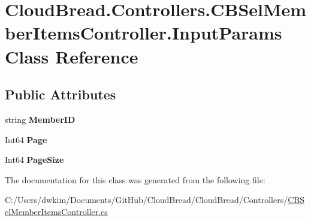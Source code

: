 \hypertarget{class_cloud_bread_1_1_controllers_1_1_c_b_sel_member_items_controller_1_1_input_params}{}\section{Cloud\+Bread.\+Controllers.\+C\+B\+Sel\+Member\+Items\+Controller.\+Input\+Params Class Reference}
\label{class_cloud_bread_1_1_controllers_1_1_c_b_sel_member_items_controller_1_1_input_params}
\subsection*{Public Attributes}
\begin{DoxyCompactItemize}
\item 
string {\bfseries Member\+ID}\hypertarget{class_cloud_bread_1_1_controllers_1_1_c_b_sel_member_items_controller_1_1_input_params_a38b1ef707609faaa2ddc2fcdf3311ef8}{}\label{class_cloud_bread_1_1_controllers_1_1_c_b_sel_member_items_controller_1_1_input_params_a38b1ef707609faaa2ddc2fcdf3311ef8}

\item 
Int64 {\bfseries Page}\hypertarget{class_cloud_bread_1_1_controllers_1_1_c_b_sel_member_items_controller_1_1_input_params_a94ad166a7dc3fdd11ae7272f7536df3b}{}\label{class_cloud_bread_1_1_controllers_1_1_c_b_sel_member_items_controller_1_1_input_params_a94ad166a7dc3fdd11ae7272f7536df3b}

\item 
Int64 {\bfseries Page\+Size}\hypertarget{class_cloud_bread_1_1_controllers_1_1_c_b_sel_member_items_controller_1_1_input_params_a74aa66e4419f55454037db8a5d14b046}{}\label{class_cloud_bread_1_1_controllers_1_1_c_b_sel_member_items_controller_1_1_input_params_a74aa66e4419f55454037db8a5d14b046}

\end{DoxyCompactItemize}


The documentation for this class was generated from the following file\+:\begin{DoxyCompactItemize}
\item 
C\+:/\+Users/dwkim/\+Documents/\+Git\+Hub/\+Cloud\+Bread/\+Cloud\+Bread/\+Controllers/\hyperlink{_c_b_sel_member_items_controller_8cs}{C\+B\+Sel\+Member\+Items\+Controller.\+cs}\end{DoxyCompactItemize}
